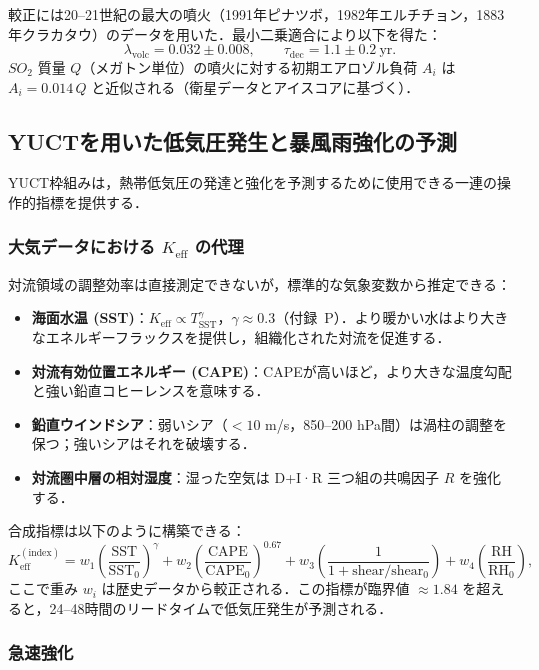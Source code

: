 \documentclass[11pt,a4paper]{article}
\newcommand{\Keff}{K_{\mathrm{eff}}}
\begin{document}
	較正には20–21世紀の最大の噴火（1991年ピナツボ，1982年エルチチョン，1883年クラカタウ）のデータを用いた．最小二乗適合により以下を得た：
	\[
	\lambda_{\text{volc}} = 0.032 \pm 0.008, \qquad \tau_{\text{dec}} = 1.1 \pm 0.2\ \text{yr}.
	\]
	$SO_2$ 質量 $Q$（メガトン単位）の噴火に対する初期エアロゾル負荷 $A_i$ は $A_i = 0.014\,Q$ と近似される（衛星データとアイスコアに基づく）．
	
	\subsection{YUCTを用いた低気圧発生と暴風雨強化の予測}
	\label{subsec:cyclone_prediction}
	
	YUCT枠組みは，熱帯低気圧の発達と強化を予測するために使用できる一連の操作的指標を提供する．
	
	\subsubsection*{大気データにおける $K_{\mathrm{eff}}$ の代理}
	
	対流領域の調整効率は直接測定できないが，標準的な気象変数から推定できる：
	\begin{itemize}
		\item \textbf{海面水温 (SST)}：$K_{\mathrm{eff}} \propto T_{\mathrm{SST}}^{\gamma}$，$\gamma \approx 0.3$（付録~P）．より暖かい水はより大きなエネルギーフラックスを提供し，組織化された対流を促進する．
		\item \textbf{対流有効位置エネルギー (CAPE)}：CAPEが高いほど，より大きな温度勾配と強い鉛直コヒーレンスを意味する．
		\item \textbf{鉛直ウインドシア}：弱いシア（$< 10$ m/s，850–200 hPa間）は渦柱の調整を保つ；強いシアはそれを破壊する．
		\item \textbf{対流圏中層の相対湿度}：湿った空気は D+I·R 三つ組の共鳴因子 $R$ を強化する．
	\end{itemize}
	合成指標は以下のように構築できる：
	\[
	\Keff^{\mathrm{(index)}} = w_1 \left( \frac{\mathrm{SST}}{\mathrm{SST}_0} \right)^{\gamma}
	+ w_2 \left( \frac{\mathrm{CAPE}}{\mathrm{CAPE}_0} \right)^{0.67}
	+ w_3 \left( \frac{1}{1 + \mathrm{shear}/\mathrm{shear}_0} \right)
	+ w_4 \left( \frac{\mathrm{RH}}{\mathrm{RH}_0} \right),
	\]
	ここで重み $w_i$ は歴史データから較正される．この指標が臨界値 $\approx 1.84$ を超えると，24--48時間のリードタイムで低気圧発生が予測される．
	
	\subsubsection*{急速強化}
	
\end{document}
